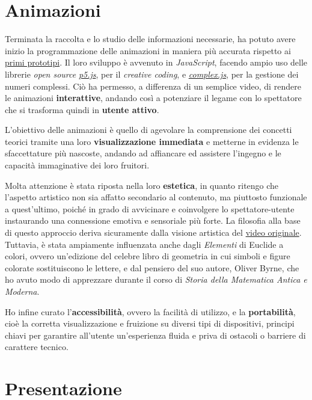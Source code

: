 \documentclass[
]{book}
\begin{document}
\hypertarget{animazioni}{%
\section{Animazioni}\label{animazioni}}

Terminata la raccolta e lo studio delle informazioni necessarie, ha potuto avere inizio la programmazione delle animazioni in maniera più accurata rispetto ai \protect\hyperlink{prototipi}{primi prototipi}.
Il loro sviluppo è avvenuto in \emph{JavaScript}, facendo ampio uso delle librerie \emph{open source} \href{https://p5js.org/}{\emph{p5.js}}, per il \emph{creative coding}, e \href{https://github.com/infusion/Complex.js/}{\emph{complex.js}}, per la gestione dei numeri complessi. Ciò ha permesso, a differenza di un semplice video, di rendere le animazioni \textbf{interattive}, andando così a potenziare il legame con lo spettatore che si trasforma quindi in \textbf{utente attivo}.

L'obiettivo delle animazioni è quello di agevolare la comprensione dei concetti teorici tramite una loro \textbf{visualizzazione immediata} e metterne in evidenza le sfaccettature più nascoste, andando ad affiancare ed assistere l'ingegno e le capacità immaginative dei loro fruitori.

Molta attenzione è stata riposta nella loro \textbf{estetica}, in quanto ritengo che l'aspetto artistico non sia affatto secondario al contenuto, ma piuttosto funzionale a quest'ultimo, poiché in grado di avvicinare e coinvolgere lo spettatore-utente instaurando una connessione emotiva e sensoriale più forte.
La filosofia alla base di questo approccio deriva sicuramente dalla visione artistica del \href{https://www.youtube.com/watch?v=r6sGWTCMz2k}{video originale}. Tuttavia, è stata ampiamente influenzata anche dagli \emph{Elementi} di Euclide a colori, ovvero un'edizione del celebre libro di geometria in cui simboli e figure colorate sostituiscono le lettere, e dal pensiero del suo autore, Oliver Byrne, che ho avuto modo di apprezzare durante il corso di \emph{Storia della Matematica Antica e Moderna}.

Ho infine curato l'\textbf{accessibilità}, ovvero la facilità di utilizzo, e la \textbf{portabilità}, cioè la corretta visualizzazione e fruizione su diversi tipi di dispositivi, principi chiavi per garantire all'utente un'esperienza fluida e priva di ostacoli o barriere di carattere tecnico.

\hypertarget{presentazione}{%
\section{Presentazione}\label{presentazione}}
\end{document}
